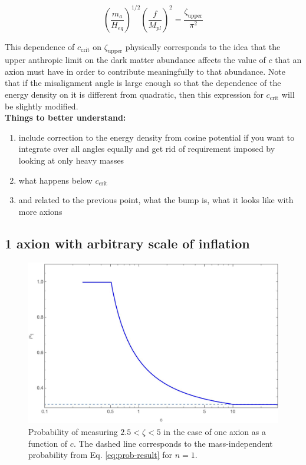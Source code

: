 \documentclass{article}
\begin{document}
\begin{equation}
    \boxed{\left(\frac{m_a}{H_{eq}}\right)^{1/2}\left(\frac{f}{M_{pl}}\right)^{2}=\frac{\zeta_\text{upper}}{\pi^2}}
\end{equation}

This dependence of $c_\text{crit}$ on $\zeta_\text{upper}$ physically corresponds to the idea that the upper anthropic limit on the dark matter abundance affects the value of $c$ that an axion must have in order to contribute meaningfully to that abundance. Note that if the misalignment angle is large enough so that the dependence of the energy density on it is different from quadratic, then this expression for $c_\text{crit}$ will be slightly modified. \\

\noindent \textbf{Things to better understand:}
\begin{enumerate}
    \item include correction to the energy density from cosine potential if you want to integrate over all angles equally and get rid of requirement imposed by looking at only heavy masses
    \item what happens below $c_\text{crit}$
    \item and related to the previous point, what the bump is, what it looks like with more axions
\end{enumerate}

\subsection{1 axion with arbitrary scale of inflation}

\begin{figure}[h]
\label{fig:1axion-unifprob}
    \includegraphics[scale=0.5]{figs/oneAxion.jpeg}
    \centering
    \caption{Probability of measuring $2.5<\zeta<5$ in the case of one axion as a function of $c$. The dashed line corresponds to the mass-independent probability from Eq. \eqref{eq:prob-result} for $n=1$.}
\end{figure}
\end{document}
